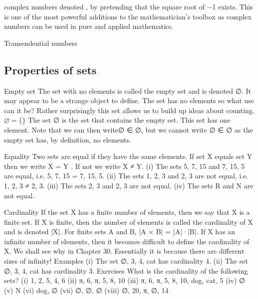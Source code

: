 complex numbers
denoted , by pretending that the square root of −1 exists. This is one of the most powerful additions to the mathematician’s toolbox as complex numbers can be used in pure and applied mathematics.

Transendential numbers

\subsection{Properties of sets}


Empty set
The set with no elements is called the empty set and is denoted ∅. It may appear to be a strange object to define. The set has no elements so what use can it be? Rather surprisingly this set allows us to build up ideas about counting.
$\varnothing = \{\}$
The set {∅} is the set that contains the empty set. This set has one element. Note that we can then write∅ ∈ {∅}, but we cannot write ∅ ∈ ∅ as the empty set has, by definition, no elements.

Equality
Two sets are equal if they have the same elements. If set X equals set Y then we write X = Y . If not we write X ≠ Y.
(i) The sets {5, 7, 15} and {7, 15, 5} are equal, i.e. {5, 7, 15} = {7, 15, 5}. 
(ii) The sets {1, 2, 3} and {2, 3} are not equal, i.e. {1, 2, 3} ≠ {2, 3}. 
(iii) The sets {2, 3} and {{2}, 3} are not equal. 
(iv) The sets R and N are not equal.

Cardinality
If the set X has a finite number of elements, then we say that X is a finite set. If X is finite, then the number of elements is called the cardinality of X and is denoted |X|. For finite sets A and B, |A × B| = |A|·|B|.
If X has an infinite number of elements, then it becomes difficult to define the cardinality of X. We shall see why in Chapter 30. Essentially it is because there are different sizes of infinity! 
Examples 
(i) The set {∅, 3, 4, cat} has cardinality 4. 
(ii) The set {∅, 3, {4, cat} } has cardinality 3.
Exercises 
What is the cardinality of the following sets? 
(i) {1, 2, 5, 4, 6} 
(ii) {π, 6, {π, 5, 8, 10}} 
(iii) {π, 6, {π, 5, 8, 10}, {dog, cat, {5}}}
(iv) ∅ 
(v) N 
(vi) {dog, ∅} 
(vii) {∅, {∅, {∅}}} 
(viii) {∅, {20, π, {∅}}, 14}





